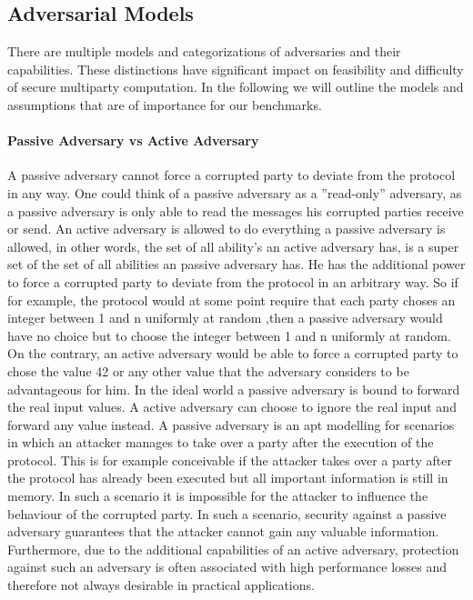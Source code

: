 \subsection{Adversarial Models}
\label{sec:Adversarial Models}
There are multiple models and categorizations of adversaries and their capabilities. These distinctions have significant impact on feasibility and difficulty of secure multiparty computation. In the following we will outline the models and assumptions that are of importance for our benchmarks. 

\paragraph{Passive Adversary vs Active Adversary}
A passive adversary cannot force a corrupted party to deviate from the protocol in any way. One could think of a passive adversary as a ''read-only'' adversary, as a passive adversary is only able to read the messages his corrupted parties receive or send. An active adversary is allowed to do everything a passive adversary is allowed, in other words, the set of all ability's an active adversary has, is a super set of the set of all abilities an passive adversary has. He has the additional power to force a corrupted party to deviate from the protocol in an arbitrary way. So if for example, the protocol would at some point require that each party choses an integer between 1 and n uniformly at random ,then a passive adversary would have no choice but to choose the integer between 1 and n uniformly at random. 
On the contrary, an active adversary would be able to force a corrupted party to chose the value 42 or any other value that the adversary considers to be advantageous for him. In the ideal world a passive adversary is bound to forward the real input values. A active adversary can choose to ignore the real input and forward any value instead. 
A passive adversary is an apt modelling for scenarios in which an attacker manages to take over a party after the execution of the protocol. This is for example conceivable if the attacker takes over a party after the protocol has already been executed but all important information is still in memory.  In such a scenario it is impossible for the attacker to influence the behaviour of the corrupted party. In such a scenario, security against a passive adversary guarantees that the attacker cannot gain any valuable information. Furthermore, due to the additional capabilities of an active adversary, protection against such an adversary is often associated with high performance losses and therefore not always desirable in practical applications.




